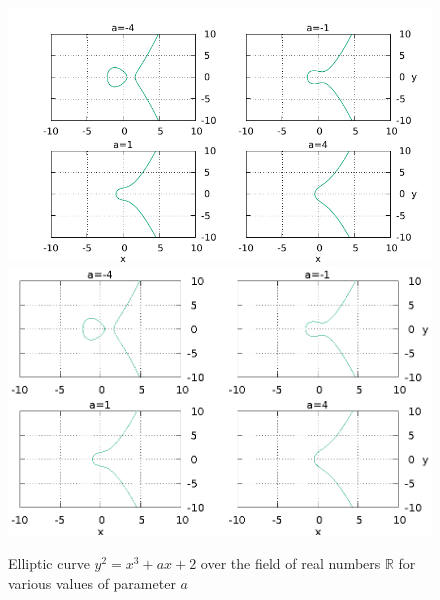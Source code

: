 \begin{figure}
\centering
\ifpdf
\includegraphics[angle=0]
{./elliptic/picelliptic.pdf}
\else
\includegraphics[angle=0]
{./elliptic/picelliptic.eps}
\fi
\caption{Elliptic curve $y^2 = x^3 + a x + 2$ over the field
  of real numbers $\mathbb{R}$ for various values of parameter $a$}
\label{fig:add:ellipticR}
\end{figure}
